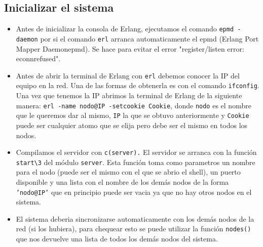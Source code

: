 \documentclass[a4paper]{article}
\newcommand{\blacktr}[0]{\item[$\blacktriangleright$]}
\begin{document}
\subsection*{Inicializar el sistema}
\begin{itemize}
    \blacktr Antes de inicializar la consola de Erlang, ejecutamos el comando \texttt{\textdollar epmd -daemon} por si el comando \texttt{\textdollar erl} arranca automaticamente el epmd (Erlang  Port  Mapper  Daemonepmd). Se hace para evitar el error "register/listen error: econnrefused".
    
    \blacktr Antes de abrir la terminal de Erlang con \texttt{\textdollar erl} debemos conocer la IP del equipo en la red. Una de las formas de obtenerla es con el comando \texttt{\textdollar ifconfig}. Una vez que tenemos la IP abrimos la terminal de Erlang de la siguiente manera: \texttt{erl -name nodo@IP -setcookie Cookie}, donde \texttt{nodo} es el nombre que le queremos dar al mismo, \texttt{IP} la que se obtuvo anteriormente y \texttt{Cookie} puede ser cualquier atomo que se elija pero debe ser el mismo en todos los nodos.
    
    \blacktr Compilamos el servidor con \texttt{c(server).} El servidor se arranca con la función \texttt{start\textbackslash3} del módulo \texttt{server}. Esta función toma como parametros un nombre para el nodo (puede ser el mismo con el que se abrio el shell), un puerto disponible y una lista con el nombre de los demás nodos de la forma \texttt{'nodo@IP'} que en principio puede ser vacia ya que no hay otros nodos en el sistema. 

    \blacktr El sistema deberia sincronizarse automaticamente con los demás nodos de la red (si los hubiera), para chequear esto se puede utilizar la función \texttt{nodes()} que nos devuelve una lista de todos los demás nodos del sistema.

\end{itemize}
\end{document}
